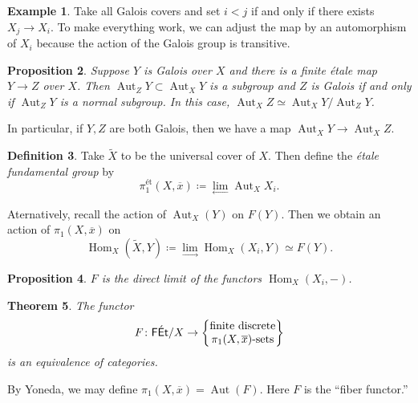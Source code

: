 \documentclass[leqno, openany]{memoir}
\newtheorem{thm}{Theorem}[section]
\newtheorem{prop}[thm]{Proposition}
\theoremstyle{definition}
\newtheorem{defn}[thm]{Definition}
\newtheorem{exm}[thm]{Example}
\theoremstyle{remark}
\theoremstyle{plain}
\theoremstyle{definition}
\theoremstyle{remark}
\newcommand{\ms}[1]{\mathsf{#1}}
\newcommand{\ol}[1]{\overline{#1}}
\newcommand{\wt}[1]{\widetilde{#1}}
\DeclareMathOperator{\Hom}{Hom}
\DeclareMathOperator{\Aut}{Aut}
\begin{document}
\begin{exm}
    Take all Galois covers and set $i < j$ if and only if there exists $X_j \to X_i$. To make everything work, we can adjust the map by an automorphism of $X_i$ because the action of the Galois group is transitive.
\end{exm}

\begin{prop}
    Suppose $Y$ is Galois over $X$ and there is a finite \'etale map $Y \to Z$ over $X$. Then $\Aut_Z Y \subset \Aut_X Y$ is a subgroup and $Z$ is Galois if and only if $\Aut_Z Y$ is a normal subgroup. In this case, $\Aut_X Z \simeq \Aut_X Y / \Aut_Z Y$.
\end{prop}

In particular, if $Y,Z$ are both Galois, then we have a map $\Aut_X Y \to \Aut_X Z$.

\begin{defn}
    Take $\wt{X}$ to be the universal cover of $X$. Then define the \textit{\'etale fundamental group} by
    \[ \pi_1^{\text{\'et}}(X,\ol{x}) \coloneqq \lim_{\longleftarrow} \Aut_X X_i. \]
\end{defn}

Aternatively, recall the action of $\Aut_X(Y)$ on $F(Y)$. Then we obtain an action of $\pi_1(X, \ol{x})$ on 
\[ \Hom_X(\wt{X}, Y) \coloneqq \lim_{\longrightarrow} \Hom_X(X_i, Y) \simeq F(Y). \]

\begin{prop}
    $F$ is the direct limit of the functors $\Hom_X(X_i, -)$.
\end{prop}

\begin{thm}
The functor 
\[ F \colon \ms{F\acute{E}t}/X \to \qty{ \Centerstack{{finite discrete} {$\pi_1(X,\ol{x})$-sets}}} \]
is an equivalence of categories.
\end{thm}

By Yoneda, we may define $\pi_1(X,\ol{x}) = \Aut(F)$. Here $F$ is the ``fiber functor.''
\end{document}
